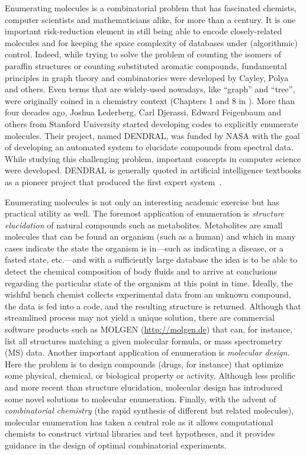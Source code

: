 \documentclass{sig-alternate}
\begin{document}
Enumerating molecules is a combinatorial problem that has fascinated
chemists, computer scientists and mathematicians alike, for more than a
century. It is one important risk-reduction element in still being
able to encode closely-related molecules and for keeping the space
complexity of databases under (algorithmic) control. Indeed, while
trying to solve the problem of counting the isomers of paraffin
structures or counting substituted aromatic compounds, fundamental
principles in graph theory and combinatorics were developed by Cayley,
Polya and others. Even terms that are widely-used nowadays, like ``graph''
and ``tree'', were originally coined in a chemistry context (Chapters 1 and
8 in \cite{faulon2010}). More than four decades ago, Joshua Lederberg,
Carl Djerassi, Edward Feigenbaum and others from Stanford University
started developing codes to explicitly enumerate molecules. Their
project, named DENDRAL, was funded by NASA with the goal of developing
an automated system to elucidate compounds from spectral data. While
studying this challenging problem, important concepts in computer
science were developed. DENDRAL is generally quoted in artificial
intelligence textbooks as a pioneer project that produced the first
expert system~\cite{DENDRAL}.

Enumerating molecules is not only an interesting academic exercise but
has practical utility as well. The foremost application of enumeration
is \emph{structure elucidation} of natural compounds such as
metabolites. Metabolites are small molecules that can be found an
organism (such as a human) and which in many cases indicate the state
the organism is in---such as indicating a disease, or a fasted state,
etc.---and with a sufficiently large database the idea is to be able
to detect the chemical composition of body fluids and to arrive at
conclusions regarding the particular state of the organism at this
point in time.  Ideally, the wishful bench chemist collects
experimental data from an unknown compound, the data is fed into a
code, and the resulting structure is returned. Although that
streamlined process may not yield a unique solution, there are
commercial software products such as MOLGEN (\url{http://molgen.de})
that can, for instance, list all structures matching a given molecular
formula, or mass spectrometry (MS) data. Another important application
of enumeration is \emph{molecular design}. Here the problem is to
design compounds (drugs, for instance) that optimize some physical,
chemical, or biological property or activity. Although less prolific
and more recent than structure elucidation, molecular design has
introduced some novel solutions to molecular enumeration. Finally,
with the advent of \emph{combinatorial chemistry} (the rapid synthesis
of different but related molecules), molecular enumeration has taken a
central role as it allows computational chemists to construct virtual
libraries and test hypotheses, and it provides guidance in the design
of optimal combinatorial experiments.
\end{document}
